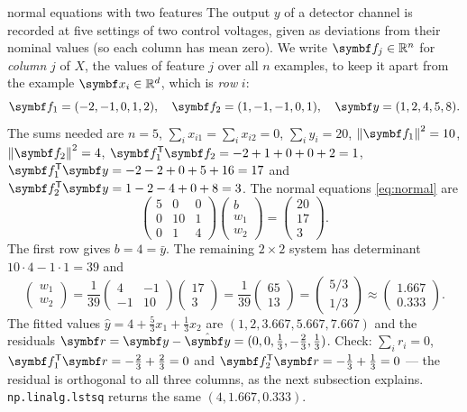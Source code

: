 \documentclass[11pt]{article}
\newcommand{\y}{\vect{y}}
\newcommand{\vr}{\vect{r}}
\begin{document}
\begin{worked}{normal equations with two features}
The output $y$ of a detector channel is recorded at five settings of two control voltages, given as deviations from
their nominal values (so each column has mean zero). We write $\vect{f}_j \in \R^n$ for \emph{column} $j$ of $X$, the
values of feature $j$ over all $n$ examples, to keep it apart from the example $\x_i \in \R^d$, which is \emph{row} $i$:
\[
  \vect{f}_1 = (-2, -1, 0, 1, 2), \quad \vect{f}_2 = (1, -1, -1, 0, 1), \quad \y = (1, 2, 4, 5, 8) .
\]
The sums needed are $n = 5$, $\sum_i x_{i1} = \sum_i x_{i2} = 0$, $\sum_i y_i = 20$, $\norm{\vect{f}_1}^2 = 10$,
$\norm{\vect{f}_2}^2 = 4$, $\vect{f}_1\T\vect{f}_2 = -2 + 1 + 0 + 0 + 2 = 1$, $\vect{f}_1\T\y = -2 - 2 + 0 + 5 + 16
= 17$ and $\vect{f}_2\T\y = 1 - 2 - 4 + 0 + 8 = 3$. The normal equations \eqref{eq:normal} are
\[
  \begin{pmatrix} 5 & 0 & 0 \\ 0 & 10 & 1 \\ 0 & 1 & 4 \end{pmatrix}
  \begin{pmatrix} b \\ w_1 \\ w_2 \end{pmatrix} = \begin{pmatrix} 20 \\ 17 \\ 3 \end{pmatrix}.
\]
The first row gives $b = 4 = \bar y$. The remaining $2 \times 2$ system has determinant $10 \cdot 4 - 1 \cdot 1 = 39$ and
\[
  \begin{pmatrix} w_1 \\ w_2 \end{pmatrix} = \frac{1}{39}\begin{pmatrix} 4 & -1 \\ -1 & 10 \end{pmatrix}
  \begin{pmatrix} 17 \\ 3 \end{pmatrix} = \frac{1}{39}\begin{pmatrix} 65 \\ 13 \end{pmatrix}
  = \begin{pmatrix} 5/3 \\ 1/3 \end{pmatrix} \approx \begin{pmatrix} 1.667 \\ 0.333 \end{pmatrix}.
\]
The fitted values $\hat y = 4 + \tfrac53 x_1 + \tfrac13 x_2$ are $(1, 2, 3.667, 5.667, 7.667)$ and the residuals
$\vr = \y - \hat{\y} = (0, 0, \tfrac13, -\tfrac23, \tfrac13)$. Check: $\sum_i r_i = 0$, $\vect{f}_1\T\vr = -\tfrac23 +
\tfrac23 = 0$ and $\vect{f}_2\T\vr = -\tfrac13 + \tfrac13 = 0$ --- the residual is orthogonal to all three columns, as the
next subsection explains. \texttt{np.linalg.lstsq} returns the same $(4, 1.667, 0.333)$.
\end{worked}
\end{document}
